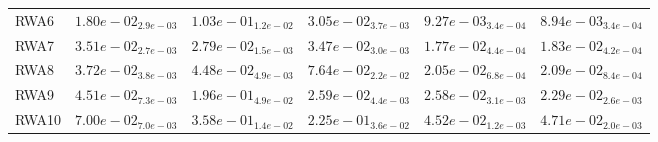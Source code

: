 \documentclass{article}
\begin{document}
\begin{table}
\begin{scriptsize}
\begin{tabular}{llllll}
RWA6 & $  1.80e-02_{ 2.9e-03}$ & $  1.03e-01_{ 1.2e-02}$ & $  3.05e-02_{ 3.7e-03}$ & \cellcolor{gray25}$  9.27e-03_{ 3.4e-04}$ & \cellcolor{gray95}$  8.94e-03_{ 3.4e-04}$ \\
RWA7 & $  3.51e-02_{ 2.7e-03}$ & $  2.79e-02_{ 1.5e-03}$ & $  3.47e-02_{ 3.0e-03}$ & \cellcolor{gray95}$  1.77e-02_{ 4.4e-04}$ & \cellcolor{gray25}$  1.83e-02_{ 4.2e-04}$ \\
RWA8 & $  3.72e-02_{ 3.8e-03}$ & $  4.48e-02_{ 4.9e-03}$ & $  7.64e-02_{ 2.2e-02}$ & \cellcolor{gray95}$  2.05e-02_{ 6.8e-04}$ & \cellcolor{gray25}$  2.09e-02_{ 8.4e-04}$ \\
RWA9 & $  4.51e-02_{ 7.3e-03}$ & $  1.96e-01_{ 4.9e-02}$ & $  2.59e-02_{ 4.4e-03}$ & \cellcolor{gray25}$  2.58e-02_{ 3.1e-03}$ & \cellcolor{gray95}$  2.29e-02_{ 2.6e-03}$ \\
RWA10 & $  7.00e-02_{ 7.0e-03}$ & $  3.58e-01_{ 1.4e-02}$ & $  2.25e-01_{ 3.6e-02}$ & \cellcolor{gray95}$  4.52e-02_{ 1.2e-03}$ & \cellcolor{gray25}$  4.71e-02_{ 2.0e-03}$ \\
\hline
\end{tabular}
\end{scriptsize}
\end{table}
\end{document}
